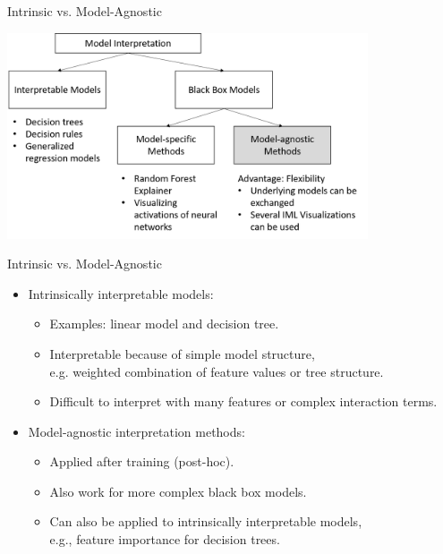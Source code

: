 \documentclass[11pt,compress,t,notes=noshow, aspectratio=169, xcolor=table]{beamer}
\begin{document}
\begin{frame}{Intrinsic vs. Model-Agnostic}
	\begin{center}
		\includegraphics[width=0.8\textwidth]{figure/overview}
	\end{center}
\end{frame}


\begin{frame}{Intrinsic vs. Model-Agnostic}
	\begin{itemize}
		\item Intrinsically interpretable models:
		\medskip
		\begin{itemize}
		\itemsep1em
			\item Examples: linear model and decision tree.
			\item Interpretable because of simple model structure,\\
			e.g. weighted combination of feature values or tree structure.
			\item Difficult to interpret with many features or complex interaction terms.
		\end{itemize}
		

		
	\medskip
	\pause
		\item Model-agnostic interpretation methods:
		\medskip
		\begin{itemize}
		\itemsep1em
			\item Applied after training (post-hoc).
			\item Also work for more complex black box models.
			\item Can also be applied to intrinsically interpretable models,\\ e.g., feature importance for decision trees.
		\end{itemize}
	\end{itemize}
\end{frame}
\end{document}
